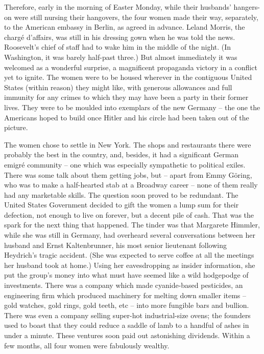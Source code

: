 Therefore, early in the morning of Easter Monday, while their husbands' hangers-on were still nursing their hangovers, the four women made their way, separately, to the American embassy in Berlin, as agreed in advance. Leland Morris, the charg\'e d'affairs, was still in his dressing gown when he was told the news. Roosevelt's chief of staff had to wake him in the middle of the night. (In Washington, it was barely half-past three.) But almost immediately it was welcomed as a wonderful surprise, a magnificent propaganda victory in a conflict yet to ignite. The women were to be housed wherever in the contiguous United States (within reason) they might like, with generous allowances and full immunity for any crimes to which they may have been a party in their former lives. They were to be moulded into exemplars of the new Germany -- the one the Americans hoped to build once Hitler and his circle had been taken out of the picture.

\divsep

The women chose to settle in New York. The shops and restaurants there were probably the best in the country, and, besides, it had a significant German emigr\'e community -- one which was especially sympathetic to political exiles. There was some talk about them getting jobs, but -- apart from Emmy G\"oring, who was to make a half-hearted stab at a Broadway career -- none of them really had any marketable skills. The question soon proved to be redundant. The United States Government decided to gift the women a lump sum for their defection, not enough to live on forever, but a decent pile of cash. That was the spark for the next thing that happened. The tinder was that Margarete Himmler, while she was still in Germany, had overheard several conversations between her husband and Ernst Kaltenbrunner, his most senior lieutenant following Heydrich's tragic accident. (She was expected to serve coffee at all the meetings her husband took at home.) Using her eavesdropping as insider information, she put the group's money into what must have seemed like a wild hodgepodge of investments. There was a company which made cyanide-based pesticides, an engineering firm which produced machinery for melting down smaller items -- gold watches, gold rings, gold teeth, etc -- into more fungible bars and bullion. There was even a company selling super-hot industrial-size ovens; the founders used to boast that they could reduce a saddle of lamb to a handful of ashes in under a minute. These ventures soon paid out astonishing dividends. Within a few months, all four women were fabulously wealthy.


